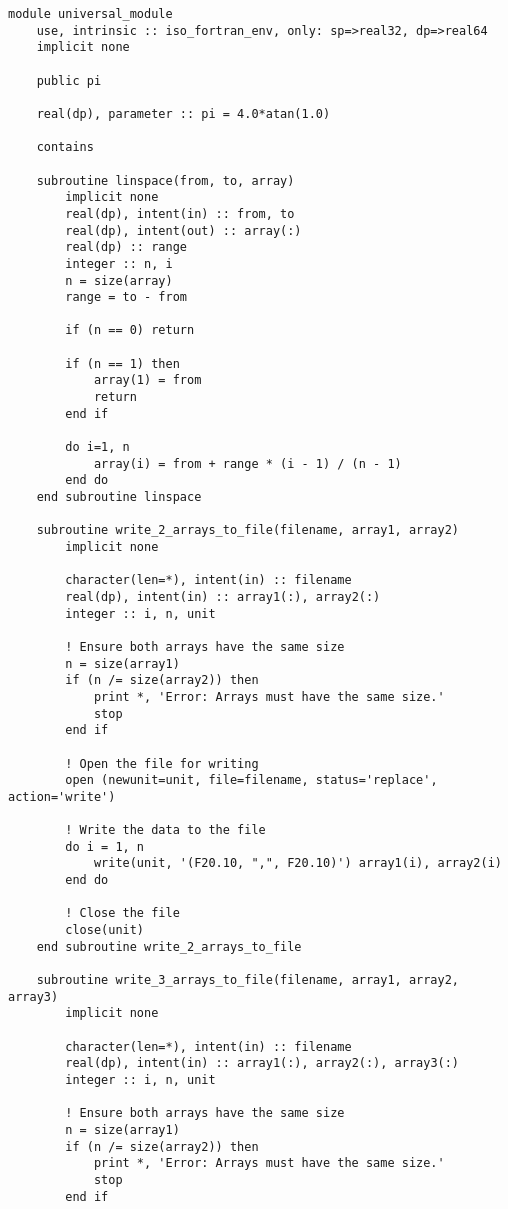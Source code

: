 \begin{verbatim}
module universal_module
    use, intrinsic :: iso_fortran_env, only: sp=>real32, dp=>real64
    implicit none

    public pi

    real(dp), parameter :: pi = 4.0*atan(1.0)

    contains

    subroutine linspace(from, to, array)
        implicit none
        real(dp), intent(in) :: from, to
        real(dp), intent(out) :: array(:)
        real(dp) :: range
        integer :: n, i
        n = size(array)
        range = to - from
    
        if (n == 0) return
    
        if (n == 1) then
            array(1) = from
            return
        end if
        
        do i=1, n
            array(i) = from + range * (i - 1) / (n - 1)
        end do
    end subroutine linspace

    subroutine write_2_arrays_to_file(filename, array1, array2)
        implicit none

        character(len=*), intent(in) :: filename
        real(dp), intent(in) :: array1(:), array2(:)
        integer :: i, n, unit
    
        ! Ensure both arrays have the same size
        n = size(array1)
        if (n /= size(array2)) then
            print *, 'Error: Arrays must have the same size.'
            stop
        end if
    
        ! Open the file for writing
        open (newunit=unit, file=filename, status='replace', action='write')
    
        ! Write the data to the file
        do i = 1, n
            write(unit, '(F20.10, ",", F20.10)') array1(i), array2(i)
        end do
    
        ! Close the file
        close(unit)
    end subroutine write_2_arrays_to_file

    subroutine write_3_arrays_to_file(filename, array1, array2, array3)
        implicit none

        character(len=*), intent(in) :: filename
        real(dp), intent(in) :: array1(:), array2(:), array3(:)
        integer :: i, n, unit
    
        ! Ensure both arrays have the same size
        n = size(array1)
        if (n /= size(array2)) then
            print *, 'Error: Arrays must have the same size.'
            stop
        end if
    

\end{verbatim}
